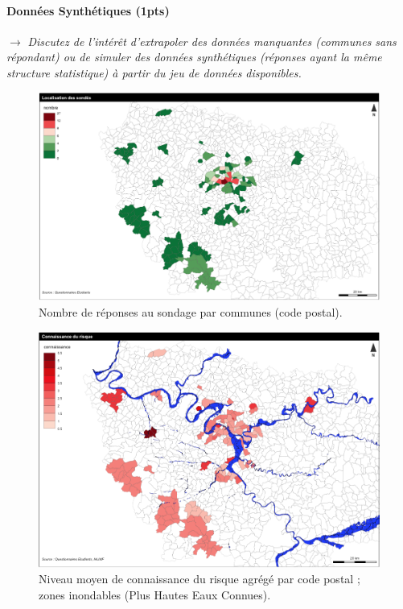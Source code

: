 \paragraph{Données Synthétiques (1pts)}

$\rightarrow$ \textit{Discutez de l'intérêt d'extrapoler des données manquantes (communes sans répondant) ou de simuler des données synthétiques (réponses ayant la même structure statistique) à partir du jeu de données disponibles.}



\begin{figure}
\centering
\includegraphics[width=\textwidth,height=0.45\textheight]{maps/count2}
\caption{Nombre de réponses au sondage par communes (code postal).}
\end{figure}


\begin{figure}
\centering
\includegraphics[width=\textwidth,height=0.43\textheight]{maps/knowledge_moreclass}
\caption{Niveau moyen de connaissance du risque agrégé par code postal ; zones inondables (Plus Hautes Eaux Connues).}
\end{figure}



